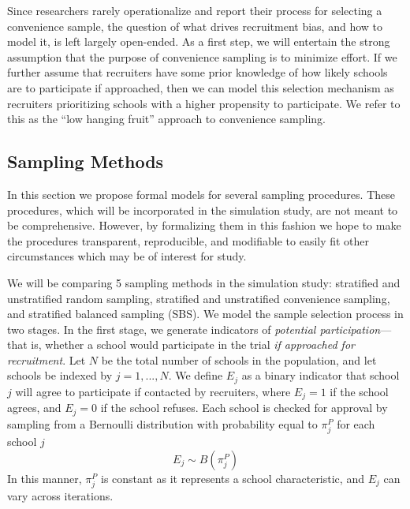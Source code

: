 \documentclass[
  english,
  man,floatsintext]{apa6}
\begin{document}
Since researchers rarely operationalize and report their process for selecting a convenience sample, the question of what drives recruitment bias, and how to model it, is left largely open-ended. As a first step, we will entertain the strong assumption that the purpose of convenience sampling is to minimize effort. If we further assume that recruiters have some prior knowledge of how likely schools are to participate if approached, then we can model this selection mechanism as recruiters prioritizing schools with a higher propensity to participate. We refer to this as the \enquote{low hanging fruit} approach to convenience sampling.

\hypertarget{sampling-methods}{%
\subsection{Sampling Methods}\label{sampling-methods}}

In this section we propose formal models for several sampling procedures. These procedures, which will be incorporated in the simulation study, are not meant to be comprehensive. However, by formalizing them in this fashion we hope to make the procedures transparent, reproducible, and modifiable to easily fit other circumstances which may be of interest for study.

We will be comparing 5 sampling methods in the simulation study: stratified and unstratified random sampling, stratified and unstratified convenience sampling, and stratified balanced sampling (SBS). We model the sample selection process in two stages. In the first stage, we generate indicators of \emph{potential participation}---that is, whether a school would participate in the trial \emph{if approached for recruitment}. Let \(N\) be the total number of schools in the population, and let schools be indexed by \(j = 1, ..., N\). We define \(E_j\) as a binary indicator that school \(j\) will agree to participate if contacted by recruiters, where \(E_j = 1\) if the school agrees, and \(E_j = 0\) if the school refuses. Each school is checked for approval by sampling from a Bernoulli distribution with probability equal to \(\pi^P_j\) for each school \(j\)
\begin{equation}
\label{eq:Ej}
E_j \sim B(\pi^P_j)
\end{equation}
In this manner, \(\pi^P_j\) is constant as it represents a school characteristic, and \(E_j\) can vary across iterations.
\end{document}
